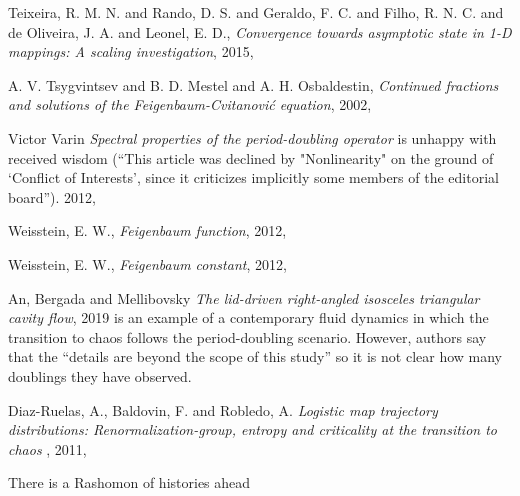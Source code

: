 \begin{description}
{Teixeira, R. M. N. and Rando, D. S. and Geraldo, F. C. and Filho, R. N.
C. and de Oliveira, J. A. and Leonel, E. D.},
{\em Convergence towards asymptotic state in {1-D} mappings: {A} scaling
investigation},
{2015},

{A. V. Tsygvintsev and B. D. Mestel and A. H. Osbaldestin},
{\em Continued fractions and solutions of the
{Feigenbaum-Cvitanovi{\'{c}}} equation},
{2002},

Victor Varin {\em Spectral properties of the period-doubling operator}
 is unhappy with received wisdom (``This article was
declined by "Nonlinearity" on the ground of `Conflict of Interests',
since it criticizes implicitly some members of the editorial board'').
{2012},

{Weisstein, E. W.},
{\em Feigenbaum function},
{2012},

{Weisstein, E. W.},
{\em Feigenbaum constant},
{2012},

{An, Bergada and Mellibovsky}
{\em The lid-driven right-angled isosceles triangular cavity flow},
{2019}
is an example of a contemporary fluid dynamics in which the transition to
chaos follows the period-doubling scenario. However, authors say that the
``details are beyond the scope of this study'' so it is not clear how
many doublings they have observed.

{Diaz-Ruelas, A., Baldovin, F. and Robledo, A.}
{\em Logistic map trajectory distributions: Renormalization-group,
entropy and criticality at the transition to chaos}
,
{2011},


\end{description}


There is a Rashomon of histories ahead

